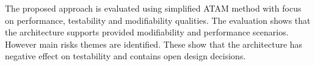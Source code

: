 \documentclass{llncs}
\begin{document}
The proposed approach is evaluated using simplified \gls{ATAM} method with focus on performance, testability and modifiability qualities. The evaluation shows that the architecture supports provided modifiability and performance scenarios. However main risks themes are identified. These show that the architecture has negative effect on testability and contains open design decisions. 









 
%

\clearpage
%
\end{document}
